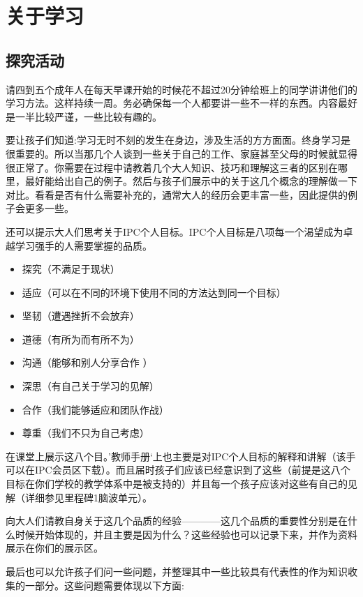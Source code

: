 \chapter{关于学习}
  
\section{探究活动}
    请四到五个成年人在每天早课开始的时候花不超过20分钟给班上的同学讲讲他们的学习方法。这样持续一周。务必确保每一个人都要讲一些不一样的东西。内容最好是一半比较严谨，一些比较有趣的。\par
    要让孩子们知道:学习无时不刻的发生在身边，涉及生活的方方面面。终身学习是很重要的。所以当那几个人谈到一些关于自己的工作、家庭甚至父母的时候就显得很正常了。你需要在过程中请教着几个大人知识、技巧和理解这三者的区别在哪里，最好能给出自己的例子。然后与孩子们展示中的关于这几个概念的理解做一下对比。看看是否有什么需要补充的，通常大人的经历会更丰富一些，因此提供的例子会更多一些。\par
    还可以提示大人们思考关于IPC个人目标。IPC个人目标是八项每一个渴望成为卓越学习强手的人需要掌握的品质。\par
    \begin{itemize}
      \item 探究（不满足于现状）
      \item 适应（可以在不同的环境下使用不同的方法达到同一个目标）
      \item 坚韧（遭遇挫折不会放弃）
      \item 道德（有所为而有所不为）
      \item 沟通（能够和别人分享合作 ）  
      \item 深思（有自己关于学习的见解）  
      \item 合作（我们能够适应和团队作战） 
      \item 尊重（我们不只为自己考虑）  
    \end{itemize}
    在课堂上展示这八个目。’教师手册‘上也主要是对IPC个人目标的解释和讲解（该手可以在IPC会员区下载）。而且届时孩子们应该已经意识到了这些（前提是这八个目标在你们学校的教学体系中是被支持的）并且每一个孩子应该对这些有自己的见解（详细参见里程碑1脑波单元）。\par
    向大人们请教自身关于这几个品质的经验————这几个品质的重要性分别是在什么时候开始体现的，并且主要是因为什么？这些经验也可以记录下来，并作为资料展示在你们的展示区。\par
    最后也可以允许孩子们问一些问题，并整理其中一些比较具有代表性的作为知识收集的一部分。这些问题需要体现以下方面:\par
